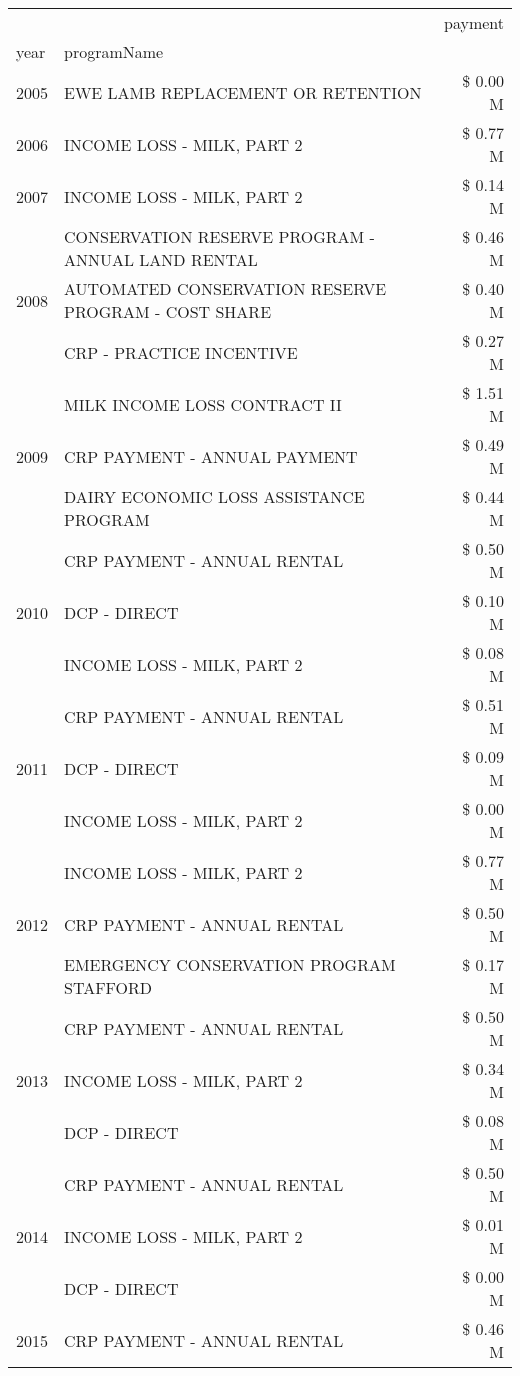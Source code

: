 \begin{tabular}{llr}
\toprule
 &  & payment \\
year & programName &  \\
\midrule
2005 & EWE LAMB REPLACEMENT OR RETENTION & \$ 0.00 M \\
\cline{1-3}
2006 & INCOME LOSS - MILK, PART 2 & \$ 0.77 M \\
\cline{1-3}
2007 & INCOME LOSS - MILK, PART 2 & \$ 0.14 M \\
\cline{1-3}
\multirow[t]{3}{*}{2008} & CONSERVATION RESERVE PROGRAM - ANNUAL LAND RENTAL & \$ 0.46 M \\
 & AUTOMATED CONSERVATION RESERVE PROGRAM - COST SHARE & \$ 0.40 M \\
 & CRP - PRACTICE INCENTIVE & \$ 0.27 M \\
\cline{1-3}
\multirow[t]{3}{*}{2009} & MILK INCOME LOSS CONTRACT II & \$ 1.51 M \\
 & CRP PAYMENT - ANNUAL PAYMENT & \$ 0.49 M \\
 & DAIRY ECONOMIC LOSS ASSISTANCE PROGRAM & \$ 0.44 M \\
\cline{1-3}
\multirow[t]{3}{*}{2010} & CRP PAYMENT - ANNUAL RENTAL & \$ 0.50 M \\
 & DCP - DIRECT & \$ 0.10 M \\
 & INCOME LOSS - MILK, PART 2 & \$ 0.08 M \\
\cline{1-3}
\multirow[t]{3}{*}{2011} & CRP PAYMENT - ANNUAL RENTAL & \$ 0.51 M \\
 & DCP - DIRECT & \$ 0.09 M \\
 & INCOME LOSS - MILK, PART 2 & \$ 0.00 M \\
\cline{1-3}
\multirow[t]{3}{*}{2012} & INCOME LOSS - MILK, PART 2 & \$ 0.77 M \\
 & CRP PAYMENT - ANNUAL RENTAL & \$ 0.50 M \\
 & EMERGENCY CONSERVATION PROGRAM STAFFORD & \$ 0.17 M \\
\cline{1-3}
\multirow[t]{3}{*}{2013} & CRP PAYMENT - ANNUAL RENTAL & \$ 0.50 M \\
 & INCOME LOSS - MILK, PART 2 & \$ 0.34 M \\
 & DCP - DIRECT & \$ 0.08 M \\
\cline{1-3}
\multirow[t]{3}{*}{2014} & CRP PAYMENT - ANNUAL RENTAL & \$ 0.50 M \\
 & INCOME LOSS - MILK, PART 2 & \$ 0.01 M \\
 & DCP - DIRECT & \$ 0.00 M \\
\cline{1-3}
\multirow[t]{2}{*}{2015} & CRP PAYMENT - ANNUAL RENTAL & \$ 0.46 M \\

\end{tabular}
